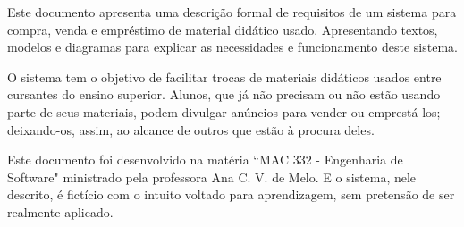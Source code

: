 
Este documento apresenta uma descrição formal de requisitos de um sistema para compra, venda e empréstimo de material didático usado. Apresentando textos, modelos e diagramas para explicar as necessidades e funcionamento deste sistema.

O sistema tem o objetivo de facilitar trocas de materiais didáticos usados entre cursantes do ensino superior. Alunos, que já não precisam ou não estão usando parte de seus materiais, podem divulgar anúncios para vender ou emprestá-los; deixando-os, assim, ao alcance de outros que estão à procura deles.

Este documento foi desenvolvido na matéria ``MAC 332 - Engenharia de Software" ministrado pela professora Ana C. V. de Melo. E o sistema, nele descrito, é fictício com o intuito voltado para aprendizagem, sem pretensão de ser realmente aplicado.
